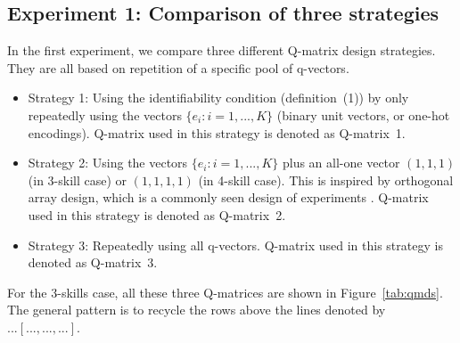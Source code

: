 \documentclass{edm_template}
\begin{document}
\subsection{Experiment 1: Comparison of three strategies}

In the first experiment, we compare three different Q-matrix design strategies. They are all based on repetition of a specific pool of q-vectors.
\begin{itemize}
\item Strategy 1: Using the identifiability condition (definition~(1)) by only repeatedly using the vectors $\{e_{i}:i=1,...,K\}$ (binary unit vectors, or one-hot encodings). Q-matrix used in this strategy is denoted as Q-matrix~1.
\item Strategy 2: Using the vectors $\{e_{i}:i=1,...,K\}$ plus an all-one vector $(1,1,1)$ (in 3-skill case) or $(1,1,1,1)$ (in 4-skill case). This is inspired by orthogonal array design, which is a commonly seen design of experiments \cite{montgomery2017design}. Q-matrix used in this strategy is denoted as Q-matrix~2.
\item Strategy 3: Repeatedly using all q-vectors. Q-matrix used in this strategy is denoted as Q-matrix~3.
\end{itemize}
For the 3-skills case, all these three Q-matrices are shown in Figure~\ref{tab:qmds}. The general pattern is to recycle the rows above the lines denoted by~$... [..., ..., ...]$.
\end{document}
